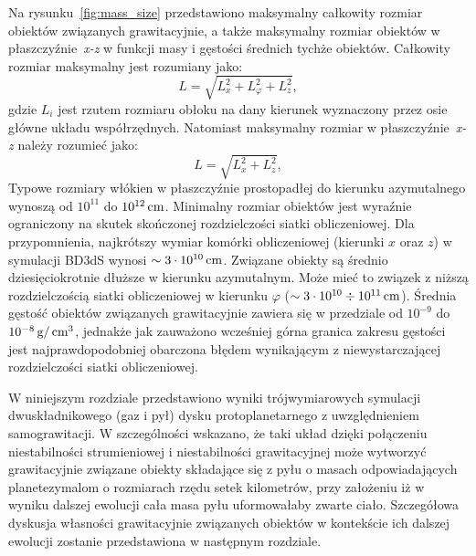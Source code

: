 %
\par Na rysunku~\ref{fig:mass_size} przedstawiono maksymalny całkowity rozmiar
obiektów związanych grawitacyjnie, a także maksymalny rozmiar obiektów w
płaszczyźnie~\emph{x-z} w funkcji masy i gęstości średnich tychże obiektów.
Całkowity rozmiar maksymalny jest rozumiany jako:
%
\begin{equation}
   L = \sqrt{L_x^2 + L_\varphi^2 + L_z^2},
\end{equation}
%
gdzie $L_i$ jest rzutem rozmiaru obłoku na dany kierunek wyznaczony przez osie
główne układu współrzędnych. Natomiast maksymalny rozmiar w
płaszczyźnie~\emph{x-z} należy rozumieć jako:
%
\begin{equation}
   L = \sqrt{L_x^2 + L_z^2},
\end{equation}
%
Typowe rozmiary włókien w płaszczyźnie prostopadłej do kierunku azymutalnego
wynoszą od $10^{11}$ do $10^{12}\hbox{$\thinspace\textrm{cm}$}$. Minimalny rozmiar obiektów jest wyraźnie
ograniczony na skutek skończonej rozdzielczości siatki obliczeniowej. Dla
przypomnienia, najkrótszy wymiar komórki obliczeniowej (kierunki $x$ oraz $z$) w
symulacji BD3dS wynosi $\sim 3\cdot10^{10}\hbox{$\thinspace\textrm{cm}$}$. Związane obiekty są średnio
dziesięciokrotnie dłuższe w kierunku azymutalnym. Może mieć to związek z niższą
rozdzielczością siatki obliczeniowej w kierunku $\varphi$ ($\sim 3\cdot10^{10}
\div 10^{11}\hbox{$\thinspace\textrm{cm}$}$). Średnia gęstość
obiektów związanych grawitacyjnie zawiera się w przedziale od $10^{-9}$ do
$10^{-8}\hbox{$\thinspace\textrm{g}$}/\hbox{$\thinspace\textrm{cm}$}^{3}$, jednakże jak zauważono wcześniej górna granica zakresu
gęstości jest najprawdopodobniej obarczona błędem wynikającym z
niewystarczającej rozdzielczości siatki obliczeniowej.
\par W niniejszym rozdziale przedstawiono wyniki trójwymiarowych symulacji
dwuskładnikowego (gaz i pył) dysku protoplanetarnego z uwzględnieniem
samograwitacji. W szczególności wskazano, że taki układ dzięki połączeniu
niestabilności strumieniowej i niestabilności grawitacyjnej może wytworzyć
grawitacyjnie związane obiekty składające się z pyłu o masach odpowiadających
planetezymalom o rozmiarach rzędu setek kilometrów, przy założeniu iż w wyniku
dalszej ewolucji cała masa pyłu uformowałaby zwarte ciało. Szczegółowa dyskusja
własności grawitacyjnie związanych obiektów w kontekście ich dalszej ewolucji
zostanie przedstawiona w następnym rozdziale.
%
